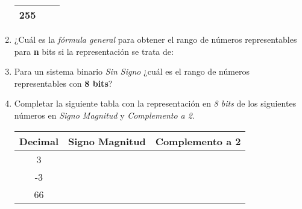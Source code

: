 \documentclass[12pt]{article}
\begin{document}
\begin{enumerate}
\begin{center}
\begin{tabular}[t]{|c|c|c|}
            255&&\\

        \hline

        \end{tabular}

    \end{center}

\item ¿Cuál es la \emph{fórmula general} para obtener el rango de números
    representables para \textbf{n} bits si la representación se trata de:


\item Para un sistema binario \emph{Sin Signo} ¿cuál es el rango de números
    representables con \textbf{8 bits}?

\item Completar la siguiente tabla con la representación en \emph{8 bits} de
    los siguientes números en \emph{Signo Magnitud} y \emph{Complemento a 2}.

    \begin{center}

        \begin{tabular}[t]{|c|c|c|}

        \hline

            \textbf{Decimal} & \textbf{Signo Magnitud} & \textbf{Complemento a
            2}\\

        \hline

            3 & \hspace{14em}~&\hspace{14em}~\\

        \hline

            -3&&\\

        \hline

            66&&\\


\end{tabular}
\end{center}
\end{enumerate}
\end{document}
